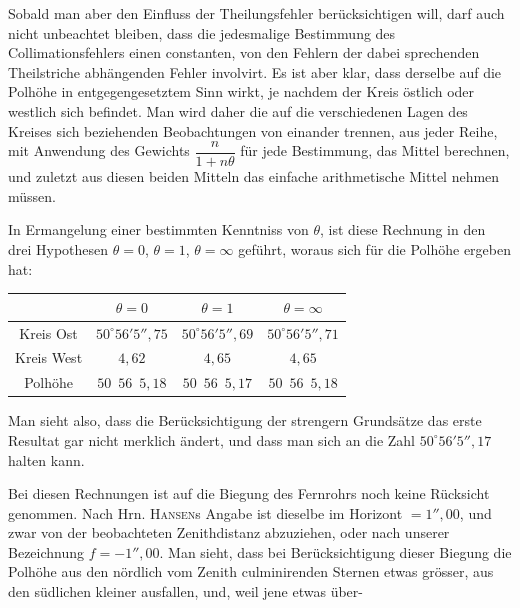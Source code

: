 Sobald man aber den Einfluss der Theilungsfehler berücksichtigen will,
darf auch nicht unbeachtet bleiben, dass die jedesmalige Bestimmung des
Collimationsfehlers einen constanten, von den Fehlern der dabei sprechenden
Theilstriche abhängenden Fehler involvirt. Es ist aber klar, dass derselbe auf
die Polhöhe in entgegengesetztem Sinn wirkt, je nachdem der Kreis östlich
oder westlich sich befindet. Man wird daher die auf die verschiedenen Lagen
des Kreises sich beziehenden Beobachtungen von einander trennen, aus jeder
Reihe, mit Anwendung des Gewichts \(\dfrac n{1+n\theta}\) für jede Bestimmung, das Mittel
berechnen, und zuletzt aus diesen beiden Mitteln das einfache arithmetische
Mittel nehmen müssen.

In Ermangelung einer bestimmten Kenntniss von \(\theta\), ist diese Rechnung
in den drei Hypothesen \(\theta=0\), \(\theta=1\), \(\theta=\infty\) geführt, woraus sich für die
Polhöhe ergeben hat:
\begin{center}
\renewcommand{\arraystretch}{1.18}%
\begin{tabular}{c|c|c|c}
&\(\theta=0\)&\(\theta=1\)&\(\theta=\infty\)\\
\hline
Kreis Ost & \(50^\circ56'5''{,}75\) & \(50^\circ56'5''{,}69\) & \(50^\circ56'5''{,}71\)\\
Kreis West & \hfill \(4{,}62\) & \hfill \(4{,}65\) & \hfill \(4{,}65\)\\
\hline
Polhöhe & \(50\enspace56\enspace5{,}18\) & \(50\enspace56\enspace5{,}17\) & \(50\enspace56\enspace5{,}18\)
\end{tabular}
\end{center}

Man sieht also, dass die Berücksichtigung der strengern Grundsätze das
erste Resultat gar nicht merklich ändert, und dass man sich an die Zahl
\(50^\circ56'5''{,}17\) halten kann.

Bei diesen Rechnungen ist auf die Biegung des Fernrohrs noch keine
Rücksicht genommen. Nach Hrn. \textsc{Hansen}s Angabe ist dieselbe im Horizont
\(=1''{,}00\), und zwar von der beobachteten Zenithdistanz abzuziehen, oder nach
unserer Bezeichnung \(f=-1''{,}00\). Man sieht, dass bei Berücksichtigung dieser
Biegung die Polhöhe aus den nördlich vom Zenith culminirenden Sternen
etwas grösser, aus den südlichen kleiner ausfallen, und, weil jene etwas über-
\par

\par\clearpage
\noindent\makebox[12mm][l]{}\par\medskip

